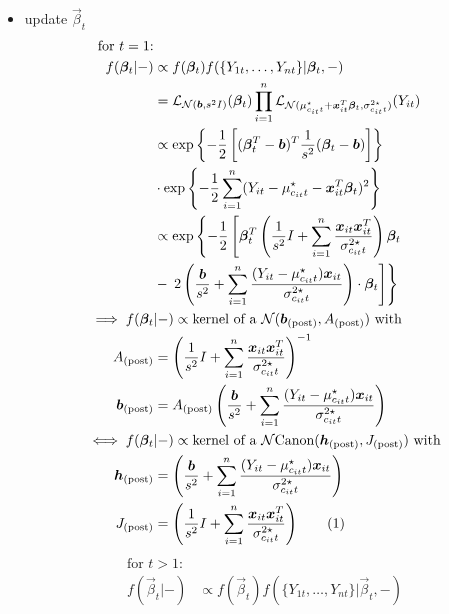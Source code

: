 \documentclass[12pt,	%
	a4paper,		%
	twoside,		%
	openright,		%
	titlepage,%
	]{book}
\theoremstyle{definition}
\begin{document}
\begin{itemize}
\item update $\vec{\beta}_t$
\begin{align*}
   \text{for $t=1$:}&\\
 f(\vec{\beta}_t|-) & \propto f(\vec{\beta}_t) f(\{ Y_{1t}, \ldots, Y_{nt}\}| \vec{\beta}_t, -)\\
 & = \law_{\N(\vec{b},s^2 I)}(\vec{\beta}_t) \prod_{i=1}^n \law_{ \N(\mu^\star_{c_{it}t} + \vec{x}_{it}^T\vec{\beta}_t,\sigma^{2\star}_{c_{it}t})}(Y_{it}) \\
 & \propto \expp{-\frac{1}{2}\left[ (\vec{\beta}_t^T -\vec{b})^T \frac{1}{s^2} (\vec{\beta}_t-\vec{b}) \right]}
 \\ & \cdot
 \expp{-\frac{1}{2} \sum_{i=1}^n ( Y_{it}-\mu^\star_{c_{it}t} - \vec{x}_{it}^T \vec{\beta}_t )^2}\\
 & \propto \exp \left\{ -\frac{1}{2} \left[ \vec{\beta}_t^T \left( \frac{1}{s^2}I + \sum_{i=1}^n \frac{\vec{x}_{it}\vec{x}_{it}^T}{\sigma^{2\star}_{c_{it}t}}\right)\vec{\beta}_t \right. \right. \\&- \left. \left. 2\left( \frac{\vec{b}}{s^2} +\sum_{i=1}^n \frac{(Y_{it}-\mu^\star_{c_{it}t})\vec{x}_{it}}{\sigma^{2\star}_{c_{it}t}} \right)\cdot \vec{\beta}_t \right] \right\}\\
 \implies f(\vec{\beta}_t&|-) \propto \text{kernel of a $\N(\vec{b}_\post, A_\post)$ with}\\
 A_\post & = \left( \frac{1}{s^2}I + \sum_{i=1}^n \frac{\vec{x}_{it}\vec{x}_{it}^T}{\sigma^{2\star}_{c_{it}t}}\right)^{-1} \\
\vec{b}_\post & = A_\post \left( \frac{\vec{b}}{s^2} +\sum_{i=1}^n \frac{(Y_{it}-\mu^\star_{c_{it}t})\vec{x}_{it}}{\sigma^{2\star}_{c_{it}t}} \right) \\
\iff f(\vec{\beta}_t&|-) \propto \text{kernel of a $\Ncan(\vec{h}_\post, J_\post)$ with}\\
\vec{h}_\post & = \left( \frac{\vec{b}}{s^2} +\sum_{i=1}^n \frac{(Y_{it}-\mu^\star_{c_{it}t})\vec{x}_{it}}{\sigma^{2\star}_{c_{it}t}} \right) \\
J_\post & = \left( \frac{1}{s^2}I + \sum_{i=1}^n \frac{\vec{x}_{it}\vec{x}_{it}^T}{\sigma^{2\star}_{c_{it}t}}\right)
\tag{\stepcounter{equation}\theequation}
\end{align*}
\begin{align*}
   \text{for $t>1$:}&\\
    f(\vec{\beta}_t|-) & \propto f(\vec{\beta}_t) f(\{ Y_{1t}, \ldots, Y_{nt}\}| \vec{\beta}_t, -)\\

\end{align*}
\end{itemize}
\end{document}
